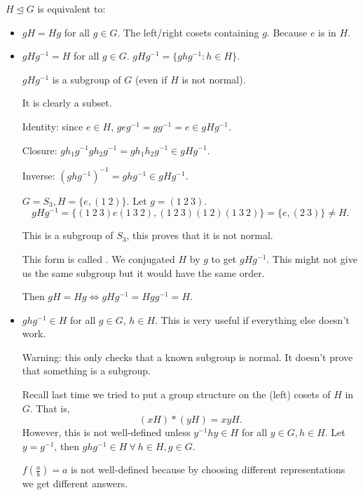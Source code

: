 \documentclass[class=article,crop=false]{standalone}
\begin{document}
\begin{note}[]
$ H \trianglelefteq G$ is equivalent to:
\begin{itemize}
	\item $ gH = Hg$ for all  $ g \in G$. The left/right cosets containing $ g$. Because  $ e$ is in  $ H$. 
	\item  $ gHg^{-1}=H$ for all $ g \in G$. $ gHg^{-1} = \{ghg^{-1}: h \in H\} $.
		\begin{claim}
			$ gHg^{-1}$ is a subgroup of $ G$ (even if  $ H$ is not normal).
		\end{claim}
		\begin{prf}
		It is clearly a subset. 

		Identity: since $ e \in H$, $ geg^{-1} = g g^{-1} = e \in gHg^{-1}$.

		Closure: $ g h_1 g^{-1} g h_2 g^{-1} = g h_1h_2 g^{-1} \in g H g^{-1}$.

		Inverse: $ (g h g^{-1})^{-1} = ghg^{-1} \in gHg^{-1}$.

		\end{prf}

\begin{eg}[]
	$ G=S_3, H= \{e, (1\ 2) \} $. Let $ g=(1\ 2\ 3)$.
	 \[
		 gHg^{-1}= \{(1\ 2\ 3)e(1\ 3\ 2), (1\ 2\ 3)(1\ 2)(1\ 3\ 2)\} =\{e, (2\ 3)\} \neq H
	.\] 
\end{eg}
This is a subgroup of $ S_3$, this proves that it is not normal.

This form is called . We conjugated $ H$ by  $ g$ to get  $ gHg^{-1}$. This might not give us the same subgroup but it would have the same order.

Then $ gH=Hg \iff gH g^{-1}=H g g^{-1} =H$.
\item $ ghg^{-1} \in H$  for all $ g \in G$, $ h \in H$. This is very useful if everything else doesn't work.

	Warning: this only checks that a known subgroup is normal. It doesn't prove that something is a subgroup.

	Recall last time we tried to put a group structure on the (left) cosets of $ H$ in  $ G$. That is,
	 \[
		 (xH)*(yH) = xyH
	.\] 
	However, this is not well-defined unless $ y^{-1} h y \in H$ for all $ y \in G, h \in H$. Let $ y=g^{-1}$, then $ ghg^{-1} \in H \ \forall \ h \in H, g \in G$.

	\begin{eg}
		$ f\left( \frac{a}{b} \right) =a $ is not well-defined because by choosing different representations we get different answers.
	\end{eg}
\end{itemize}
\end{note}
\end{document}
